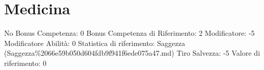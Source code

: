 \section{Medicina}\label{medicina}

\begin{description}
\tightlist
\item[Tags: ABI]
No Bonus Competenza: 0 Bonus Competenza di Riferimento: 2 Modificatore:
-5 Modificatore Abilità: 0 Statistica di riferimento: Saggezza
(Saggezza\%2066e59b050d604fdb9f941f6ede075a47.md) Tiro Salvezza: -5
Valore di riferimento: 0
\end{description}
